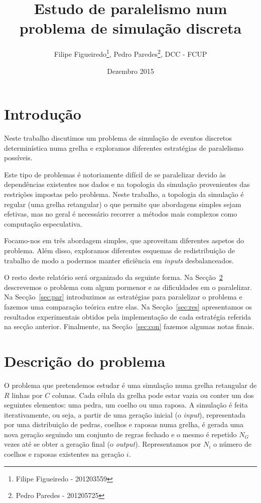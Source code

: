 \documentclass[10pt,a4paper,oneside]{article}
\title{Estudo de paralelismo num problema de simulação discreta}
\author{Filipe Figueiredo\footnote{Filipe Figueiredo - 201203559},
  Pedro Paredes\footnote{Pedro Paredes - 201205725}, DCC - FCUP}
\date{Dezembro 2015}
\begin{document}
\maketitle


\section{Introdução}
\label{sec:intro}
Neste trabalho discutimos um problema de simulação de eventos
discretos determinística numa grelha e exploramos diferentes
estratégias de paralelismo possíveis.

Este tipo de problemas é notoriamente difícil de se paralelizar devido
às dependências existentes nos dados e na topologia da simulação
provenientes das restrições impostas pelo problema. Neste trabalho, a
topologia da simulação é regular (uma grelha retangular) o que permite
que abordagens simples sejam efetivas, mas no geral é necessário
recorrer a métodos mais complexos como computação especulativa.

Focamo-nos em três abordagem simples, que aproveitam diferentes
aspetos do problema. Além disso, exploramos diferentes esquemas de
redistribuição de trabalho de modo a podermos manter eficiência em
\textit{inputs} desbalanceados.

O resto deste relatório será organizado da seguinte forma. Na
Secção~\ref{sec:prob} descrevemos o problema com algum pormenor e as
dificuldades em o paralelizar. Na Secção~\ref{sec:par} introduzimos as
estratégias para paralelizar o problema e fazemos uma comparação
teórica entre elas. Na Secção~\ref{sec:res} apresentamos os resultados
experimentais obtidos pela implementação de cada estratégia referida
na secção anterior. Finalmente, na Secção~\ref{sec:con} fazemos
algumas notas finais.


\section{Descrição do problema}
\label{sec:prob}
O problema que pretendemos estudar é uma simulação numa grelha
retangular de $R$ linhas por $C$ colunas. Cada célula da grelha pode
estar vazia ou conter um dos seguintes elementos: uma pedra, um coelho
ou uma raposa. A simulação é feita iterativamente, ou seja, a partir
de uma geração inicial (o \textit{input}), representada por uma
distribuição de pedras, coelhos e raposas numa grelha, é gerada uma
nova geração seguindo um conjunto de regras fechado e o mesmo é
repetido $N_G$ vezes até se obter a geração final (o
\textit{output}). Representamos por $N_i$ o número de coelhos e
raposas existentes na geração $i$.
\end{document}

